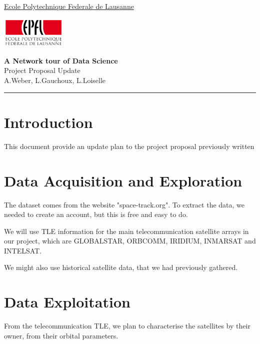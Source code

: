 \documentclass[11pt,letterpaper]{article}
\begin{document}
\pagestyle{plain}
\begin{flushleft}
\underline{Ecole Polytechnique Federale de Lausanne} \hfill
\end{flushleft}

\begin{flushright}\vspace{-5mm}
\includegraphics[height=1.5cm]{logo.png}
\end{flushright}
 
\begin{center}\vspace{-1cm}
\textbf{\large A Network tour of Data Science}\\
Project Proposal Update\\
A.Weber, L.Gauchoux, L.Loiselle
\end{center}

 
\rule{\linewidth}{0.1mm}

\section{Introduction}

This document provide an update plan to the project proposal previously written

\section{Data Acquisition and Exploration}

The dataset comes from the website "space-track.org".
To extract the data, we needed to create an account, but this is free and easy to do.

We will use TLE information for the main telecommunication satellite arrays in our project, which are GLOBALSTAR, ORBCOMM, IRIDIUM, INMARSAT and INTELSAT.

We might also use historical satellite data, that we had previously gathered.


\section{Data Exploitation}

From the telecommunication TLE, we plan to characterise the satellites by their owner, from their orbital parameters.
\end{document}
